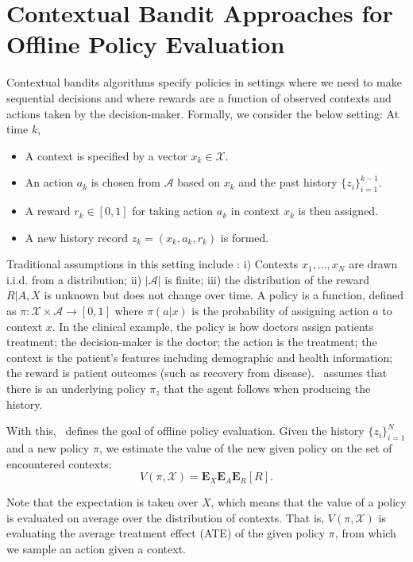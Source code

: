 \section{Contextual Bandit Approaches for Offline Policy Evaluation} \label{bandits}
Contextual bandits algorithms specify policies in settings where we need to make sequential decisions and where rewards are a function of observed contexts and actions taken by the decision-maker. Formally, we consider the below setting: 
At time $k$, 
\begin{itemize}
    \item A context is specified by a vector $x_k \in \mathcal{X}.$
    \item An action $a_k$ is chosen from $\mathcal{A}$ based on $x_k$ and the past history $\{z_i\}_{i=1}^{k-1}$.
    \item A reward $r_k \in [0,1]$ for taking action $a_k$ in context $x_k$ is then assigned. 
    \item A new history record $z_k = (x_k, a_k, r_k)$ is formed.
\end{itemize}
Traditional assumptions in this setting include \cite{dudik2014doubly}: i) Contexts $x_1, ..., x_N$ are drawn i.i.d. from a distribution; ii) $|\mathcal{A}|$ is finite; iii) the distribution of the reward $R|A, X$ is unknown but does not change over time. A policy is a function, defined as $\pi: \mathcal{X} \times \mathcal{A} \to [0,1]$ where $\pi(a|x)$ is the probability of assigning action $a$ to context $x$. In the clinical example, the policy is how doctors assign patients treatment; the decision-maker is the doctor; the action is the treatment; the context is the patient's features including demographic and health information; the reward is patient outcomes (such as recovery from disease).~\cite{dudik2014doubly} assumes that there is an underlying policy $\pi_z$ that the agent follows when producing the history.

With this,~\cite{dudik2014doubly} defines the goal of offline policy evaluation. Given the history $\{z_i\}_{i=1}^N$ and a new policy $\pi$, we estimate the value of the new given policy on the set of encountered contexts:
$$ V(\pi, \mathcal{X}) = \mathbf{E}_{X}\mathbf{E}_{A}\mathbf{E}_{R}[R].$$

Note that the expectation is taken over $X$, which means that the value of a policy is evaluated on average over the distribution of contexts. That is, $V(\pi, \mathcal{X})$ is evaluating the average treatment effect (ATE) of the given policy $\pi$, from which we sample an action given a context. %


